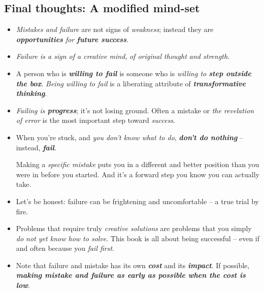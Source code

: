 \documentclass[11pt]{article}
\begin{document}
\subsection{Final thoughts: A modified mind-set}
\begin{itemize}
\item \emph{Mistakes and failure} are not signs of \emph{weakness}; instead they are \emph{\textbf{opportunities} for \textbf{future success}}. 

\item \emph{Failure is a sign of a creative mind}, \emph{of original thought and strength}.

\item A person who is \emph{\textbf{willing to fail}} is someone who is \emph{willing to \textbf{step outside the box}}. \emph{Being willing
to fail} is a liberating attribute of \emph{\textbf{transformative thinking}}.

\item \textit{Failing is \textbf{progress}}; it’s not losing ground. Often a mistake or \emph{the revelation of error} is the most important step toward \emph{success}. 

\item When you’re stuck, and \emph{you don’t know what to do}, \emph{\textbf{don’t do nothing}} -- instead, \emph{\textbf{fail}}. 

Making a \emph{specific mistake} puts you in a different and better position than you were in before you started. And it’s a forward step you know you can actually take.

\item Let’s be honest: failure can be frightening and uncomfortable -- a true trial by fire. 

\item Problems that require truly \emph{creative solutions} are problems that you simply \emph{do not yet know how to solve}. This book is all about being successful -- even if and often because you \emph{fail first}.

\item Note that failure and mistake has its own \emph{\textbf{cost}} and its \emph{\textbf{impact}}. If possible, \emph{\textbf{making mistake and failure as early as possible when the cost is low}}. 
\end{itemize}
\end{document}
